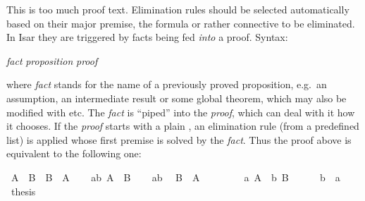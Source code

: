\begin{isabellebody}
\begin{isamarkuptext}
This is too much proof text. Elimination rules should be selected
automatically based on their major premise, the formula or rather connective
to be eliminated. In Isar they are triggered by facts being fed
\emph{into} a proof. Syntax:
\begin{center}
 \emph{fact}  \emph{proposition} \emph{proof}
\end{center}
where \emph{fact} stands for the name of a previously proved
proposition, e.g.\ an assumption, an intermediate result or some global
theorem, which may also be modified with  etc.
The \emph{fact} is ``piped'' into the \emph{proof}, which can deal with it
how it chooses. If the \emph{proof} starts with a plain ,
an elimination rule (from a predefined list) is applied
whose first premise is solved by the \emph{fact}. Thus the proof above
is equivalent to the following one:%
\end{isamarkuptext}%
\isamarkuptrue%
\isamarkupfalse%
\ {}A\ {}\ B\ {}\ B\ {}\ A{}\isanewline
%
\isadelimproof
%
\endisadelimproof
%
\isatagproof
{}\isamarkupfalse%
\isanewline
\ \ \isamarkupfalse%
\ ab{}\ {}A\ {}\ B{}\isanewline
\ \ \isamarkupfalse%
\ ab\ \isamarkupfalse%
\ {}B\ {}\ A{}\isanewline
\ \ \isamarkupfalse%
\isanewline
\ \ \ \ \isamarkupfalse%
\ a{}\ {}A{}\ \ b{}\ {}B{}\isanewline
\ \ \ \ \isamarkupfalse%
\ b\ \ a\ \isamarkupfalse%
\ {}thesis\ \isamarkupfalse%
\isanewline
\ \ \isamarkupfalse%
\isanewline
{}\isamarkupfalse%
%
\endisatagproof
{\isafoldproof}%
%
\isadelimproof
%
\endisadelimproof

\end{isabellebody}
